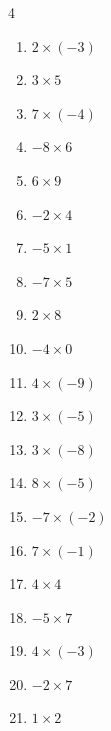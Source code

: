 \begin{multicols}{4}
\begin{enumerate}
  \item $2\times (-3)$
        \phantom{$=-6$}

  \item $3\times 5$
        \phantom{$=15$}

  \item $7\times (-4)$
        \phantom{$=-28$}

  \item $-8\times 6$
        \phantom{$=-48$}

  \item $6\times 9$
        \phantom{$=54$}

  \item $-2\times 4$
        \phantom{$=-8$}

  \item $-5\times 1$
        \phantom{$=-5$}

  \item $-7\times 5$
        \phantom{$=-35$}

  \item $2\times 8$
        \phantom{$=16$}

  \item $-4\times 0$
        \phantom{$=0$}

  \item $4\times (-9)$
        \phantom{$=-36$}

  \item $3\times (-5)$
        \phantom{$=-15$}

  \item $3\times (-8)$
        \phantom{$=-24$}

  \item $8\times (-5)$
        \phantom{$=-40$}

  \item $-7\times (-2)$
        \phantom{$=14$}

  \item $7\times (-1)$
        \phantom{$=-7$}

  \item $4\times 4$
        \phantom{$=16$}

  \item $-5\times 7$
        \phantom{$=-35$}

  \item $4\times (-3)$
        \phantom{$=-12$}

  \item $-2\times 7$
        \phantom{$=-14$}

  \item $1\times 2$
        \phantom{$=2$}


\end{enumerate}
\end{multicols}
